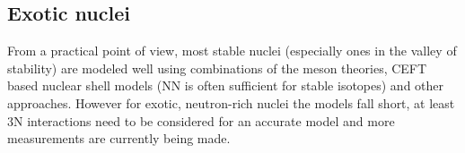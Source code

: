 \subsection{Exotic nuclei}
From a practical point of view, most stable nuclei (especially ones in the valley of stability) are modeled well using combinations of the meson theories, CEFT based nuclear shell models (NN is often sufficient for stable isotopes) and other approaches.
However for exotic, neutron-rich nuclei the models fall short, at least 3N interactions need to be considered for an accurate model and more measurements are currently being made.






